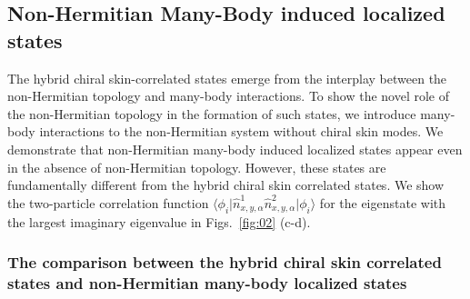 \documentclass[longbibliography, aps, prx, amsmath, amssymb, amsfonts, twocolumn,superscriptaddress, footinbib]{revtex4-1}
\begin{document}

	\subsection{Non-Hermitian Many-Body induced localized states\label{sec:NHMBL}}

	The hybrid chiral skin-correlated states emerge from the interplay between the non-Hermitian topology and many-body interactions. To show the novel role of the non-Hermitian topology in the formation of such states, we introduce many-body interactions to the non-Hermitian system without chiral skin modes.
	We demonstrate that non-Hermitian many-body induced localized states appear even in the absence of non-Hermitian topology. However, these states are fundamentally different from the hybrid chiral skin correlated states.
    We show the two-particle correlation function $\langle \phi_i \vert \hat{n}^1_{x,y,\alpha} \hat{n}^2_{x,y,\alpha} \vert \phi_i \rangle$ for the eigenstate with the largest imaginary eigenvalue in Figs.~\ref{fig:02} (c-d).

	\subsubsection{The comparison between the hybrid chiral skin correlated states and non-Hermitian many-body localized states~\label{sec:appendixE_comp}}
    
\end{document}
